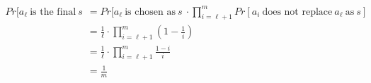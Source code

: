 \begin{equation}
	\begin{split}
	Pr[a_\ell\ \textrm{is the final}\ s\ 
	& = Pr[a_\ell\ \textrm{is chosen as}\ s\ \cdot \prod_{i=\ell+1}^{m} Pr[a_i\ \textrm{does not replace}\ a_\ell\ \textrm{as}\ s] \\
	& = \frac{1}{\ell} \cdot \prod_{i=\ell+1}^{m}\left(1-\frac{1}{i}\right) \\
	& = \frac{1}{\ell} \cdot \prod_{i=\ell+1}^{m}\frac{1-i}{i} \\
	& = \frac{1}{m}
	\end{split}
\end{equation}